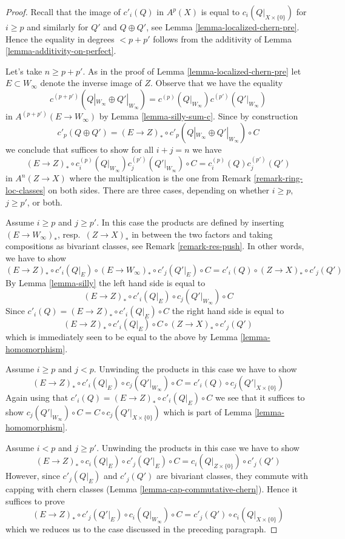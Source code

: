 \begin{proof}
Recall that the image of $c'_i(Q)$ in $A^p(X)$ is equal to
$c_i(Q|_{X \times \{0\}})$ for $i \geq p$ and similarly for
$Q'$ and $Q \oplus Q'$, see Lemma \ref{lemma-localized-chern-pre}.
Hence the equality in degrees $< p + p'$ follows from the
additivity of Lemma \ref{lemma-additivity-on-perfect}.

\medskip\noindent
Let's take $n \geq p + p'$.
As in the proof of Lemma \ref{lemma-localized-chern-pre}
let $E \subset W_\infty$ denote the inverse image of $Z$.
Observe that we have the equality
$$
c^{(p + p')}(Q|_{W_\infty} \oplus Q'|_{W_\infty}) =
c^{(p)}(Q|_{W_\infty})c^{(p')}(Q'|_{W_\infty})
$$
in $A^{(p + p')}(E \to W_\infty)$ by Lemma \ref{lemma-silly-sum-c}.
Since by construction
$$
c'_p(Q \oplus Q') = (E \to Z)_* \circ
c'_p(Q|_{W_\infty} \oplus Q'|_{W_\infty}) \circ C
$$
we conclude that suffices to show for all $i + j = n$ we have
$$
(E \to Z)_* \circ
c^{(p)}_i(Q|_{W_\infty})c^{(p')}_j(Q'|_{W_\infty})
\circ C
=
c^{(p)}_i(Q)c^{(p')}_j(Q')
$$
in $A^n(Z \to X)$ where the multiplication is the one from
Remark \ref{remark-ring-loc-classes} on both sides. There are
three cases, depending on whether $i \geq p$, $j \geq p'$, or both.

\medskip\noindent
Assume $i \geq p$ and $j \geq p'$. In this case the products are
defined by inserting $(E \to W_\infty)_*$, resp.\ $(Z \to X)_*$ in between
the two factors and taking compositions as bivariant classes, see
Remark \ref{remark-res-push}.
In other words, we have to show
$$
(E \to Z)_* \circ c'_i(Q|_E) \circ
(E \to W_\infty)_* \circ c'_j(Q'|_E) \circ C =
c'_i(Q) \circ (Z \to X)_* \circ c'_j(Q')
$$
By Lemma \ref{lemma-silly} the left hand side is equal to
$$
(E \to Z)_* \circ c'_i(Q|_E) \circ c_j(Q'|_{W_\infty}) \circ C
$$
Since $c'_i(Q) = (E \to Z)_* \circ c'_i(Q|_E) \circ C$
the right hand side is equal to
$$
(E \to Z)_* \circ c'_i(Q|_E) \circ C \circ (Z \to X)_* \circ c'_j(Q')
$$
which is immediately seen to be equal to the above
by Lemma \ref{lemma-homomorphism}.

\medskip\noindent
Assume $i \geq p$ and $j < p$. Unwinding the products
in this case we have to show
$$
(E \to Z)_* \circ c'_i(Q|_E) \circ c_j(Q'|_{W_\infty}) \circ C =
c'_i(Q) \circ c_j(Q'|_{X \times \{0\}})
$$
Again using that $c'_i(Q) = (E \to Z)_* \circ c'_i(Q|_E) \circ C$
we see that it suffices to show $c_j(Q'|_{W_\infty}) \circ C =
C \circ c_j(Q'|_{X \times \{0\}})$ which is part of
Lemma \ref{lemma-homomorphism}.

\medskip\noindent
Assume $i < p$ and $j \geq p'$. Unwinding the products
in this case we have to show
$$
(E \to Z)_* \circ c_i(Q|_E) \circ c'_j(Q'|_E) \circ C =
c_i(Q|_{Z \times \{0\}}) \circ c'_j(Q')
$$
However, since $c'_j(Q|_E)$ and $c'_j(Q')$ are
bivariant classes, they commute with capping with chern classes
(Lemma \ref{lemma-cap-commutative-chern}). Hence it suffices to prove
$$
(E \to Z)_* \circ c'_j(Q'|_E) \circ c_i(Q|_{W_\infty}) \circ C =
c'_j(Q') \circ c_i(Q|_{X \times \{0\}})
$$
which we reduces us to the case discussed in the preceding paragraph.
\end{proof}

